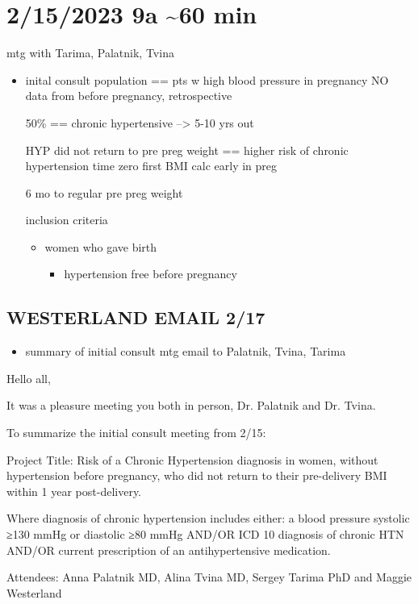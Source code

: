 \documentclass[11pt]{article}
\begin{document}
\section{2/15/2023 9a \textasciitilde{}60 min}
\label{sec:org62c6b6b}
mtg with Tarima, Palatnik, Tvina
\begin{itemize}
\item inital consult
population == pts w high blood pressure in pregnancy NO data from before pregnancy, retrospective

50\% == chronic hypertensive --> 5-10 yrs out

HYP did not return to pre preg weight == higher risk of chronic hypertension
time zero  first BMI calc  early in preg

6 mo to regular pre preg weight

inclusion criteria
\begin{itemize}
\item women who gave birth
\begin{itemize}
\item hypertension free before pregnancy
\end{itemize}
\end{itemize}
\end{itemize}

\subsection{WESTERLAND EMAIL 2/17}
\label{sec:org61ef8e1}
\begin{itemize}
\item summary of initial consult mtg email to Palatnik, Tvina, Tarima
\end{itemize}

Hello all,

It was a pleasure meeting you both in person, Dr. Palatnik and Dr. Tvina.

To summarize the initial consult meeting from 2/15:

Project Title: Risk of a Chronic Hypertension diagnosis in women, without hypertension before pregnancy, who did not return to their pre-delivery BMI within 1 year post-delivery.

Where diagnosis of chronic hypertension includes either:
a blood pressure systolic ≥130 mmHg or diastolic ≥80 mmHg AND/OR
ICD 10 diagnosis of chronic HTN AND/OR
current prescription of an antihypertensive medication.

Attendees: Anna Palatnik MD, Alina Tvina MD, Sergey Tarima PhD and Maggie Westerland
\end{document}
